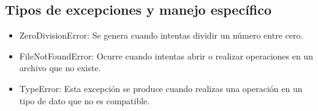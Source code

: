 \subsection{Tipos de excepciones y manejo específico}
\begin{itemize}
    \item ZeroDivisionError: Se genera cuando intentas dividir un número entre cero.
    \begin{figure}[h]
        \centering
      \end{figure}
    \newpage
    \item FileNotFoundError: Ocurre cuando intentas abrir o realizar operaciones en un archivo que no existe.
    \begin{figure}[h]
        \centering
      \end{figure}
    
    \item TypeError: Esta excepción se produce cuando realizas una operación en un tipo de dato que no es compatible.
    \begin{figure}[h]
        \centering
      \end{figure}
    

\end{itemize}
